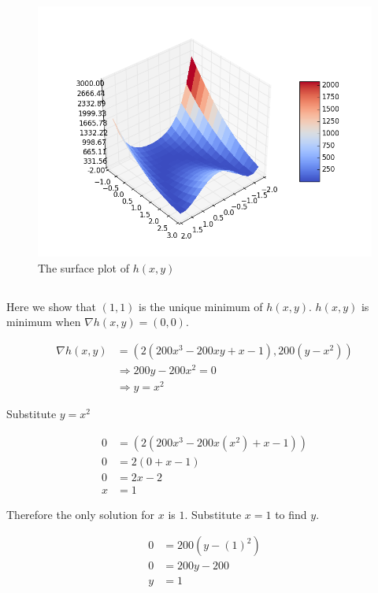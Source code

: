 \documentclass[11pt]{article}
\begin{document}
\begin{figure}[H]
	\centering
		\includegraphics[trim={1cm 1cm 0.5cm 0.7cm},clip, scale=0.7]{images/exercise2_1.png}
		\caption{The surface plot of $h(x,y)$}
	\label{fig:surface}
\end{figure}

\subsection{}

Here we show that $(1,1)$ is the unique minimum of $h(x, y)$.
$h(x, y)$ is minimum when $\nabla h(x,y) = (0,0)$.

\begin{align*}
\nabla h(x,y) & = (2 (200 x^3-200 x y+x-1), 200 (y-x^2)) \\
& \Rightarrow 200y - 200x^2 = 0 \\
& \Rightarrow y = x^2
\end{align*}

Substitute $y = x^2$

\begin{align*}
0 & = (2(200x^3 - 200x(x^2) + x - 1)) \\
0 & = 2(0 + x - 1) \\
0 & = 2x - 2 \\
x &= 1
\end{align*}

Therefore the only solution for $x$ is $1$. Substitute $x = 1$ to find $y$.

\begin{align*}
0 & = 200(y - (1)^2) \\
0 & = 200y - 200 \\
y & = 1
\end{align*}
\end{document}
